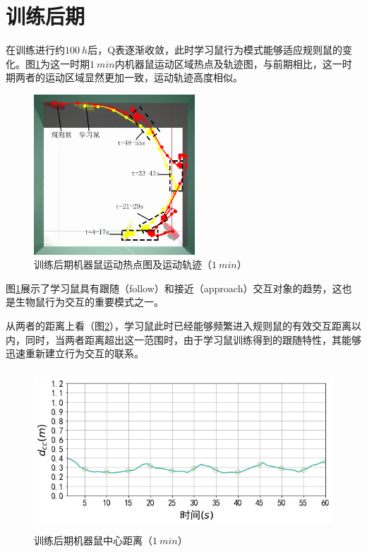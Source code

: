 \section{训练后期}
在训练进行约$100~h$后，Q表逐渐收敛，此时学习鼠行为模式能够适应规则鼠的变化。图\ref{figure_matureheatmap}为这一时期$1~min$内机器鼠运动区域热点及轨迹图，与前期相比，这一时期两者的运动区域显然更加一致，运动轨迹高度相似。
\begin{figure}[htbp]
  \vspace{13pt}
  \centering
  \includegraphics[height=6cm]{images/ch05/mature/heatmap.png}
  \caption{训练后期机器鼠运动热点图及运动轨迹（$1~min$）}\label{figure_matureheatmap}
\end{figure} 

图\ref{figure_matureheatmap}展示了学习鼠具有跟随（follow）和接近（approach）交互对象的趋势，这也是生物鼠行为交互的重要模式之一。

从两者的距离上看（图\ref{figure_maturedistance}），学习鼠此时已经能够频繁进入规则鼠的有效交互距离以内，同时，当两者距离超出这一范围时，由于学习鼠训练得到的跟随特性，其能够迅速重新建立行为交互的联系。
\begin{figure}[htbp]
  \vspace{13pt}
  \centering
  \includegraphics[height=6cm]{images/ch05/mature/distance.png}
  \caption{训练后期机器鼠中心距离（$1~min$）}\label{figure_maturedistance}
\end{figure}

